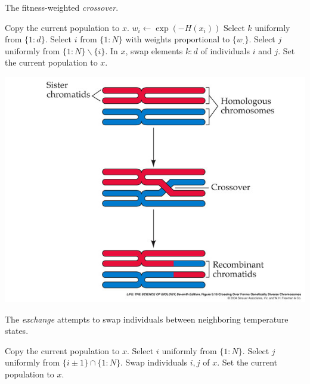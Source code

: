 \documentclass{beamer}\usepackage[]{graphicx}\usepackage[]{color}
\begin{document}
\begin{frame}
 \begin{algorithm}[H]
   \caption{The fitness-weighted {\it crossover}.}
   \label{alg:crossover}
   \footnotesize
   \begin{algorithmic}
     \State Copy the current population to $x$.
     \State $w_i \gets \exp(-H(x_i))$
     \EndFor
     \State Select $k$ uniformly from $\{1\colon d\}.$
     \State Select $i$ from $\{1\colon N\}$ with weights proportional
     to $\{w_\cdot\}$.
     \State Select $j$ uniformly from $\{1\colon N\} \backslash \{i\}.$ 
    \State In $x$, swap elements $k\colon d$ of individuals $i$ and $j$.
     \Wp {$\cdots$} 
     \State  Set the  current population to $x$.
     \EndWp
     \EndProcedure
   \end{algorithmic}
 \end{algorithm}
 \end{frame}

 \begin{frame}
   \includegraphics[height=\textheight]{figure/xover}
 \end{frame}
 

\begin{frame}
\begin{algorithm}[H]
\caption{The {\it exchange} attempts to swap individuals between neighboring temperature states.}
  \label{alg:exchange}
  \footnotesize
  \begin{algorithmic}
    \State Copy the current population to $x$.
    \State Select $i$ uniformly from $\{1\colon N\}$. 
    \State Select $j$ uniformly from $\{i\pm 1\}\cap\{1\colon N\}$.
    \State Swap individuals $i,j$ of $x$.
    \State Set the current population to $x$.
    \EndWp
    \EndProcedure
  \end{algorithmic}
\end{algorithm}
\end{frame}
\end{document}
